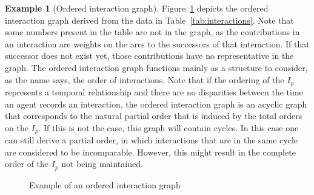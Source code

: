 \documentclass[a4paper,11pt]{book}
\theoremstyle{definition}
\newtheorem{example}{Example}
\begin{document}
\begin{example}[Ordered interaction graph]
    Figure~\ref{fig:ex_oig} depicts the ordered interaction graph derived from the data in Table~\ref{tab:interactions}.
    Note that some numbers present in the table are not in the graph, as the contributions in an interaction are
    weights on the arcs to the successors of that interaction. If that successor does not exist yet, those
    contributions have no representative in the graph. The ordered interaction graph functions mainly as a 
    structure to consider, as the name says, the order of interactions. Note that if the ordering of the $I_p$ represents
    a temporal relationship and there are no disparities between the time an agent records an interaction, 
    the ordered interaction graph is an acyclic graph that corresponds to the natural partial order that
    is induced by the total orders on the $I_p$. If this is not the case, this graph will contain cycles.
    In this case one can still derive a partial order, in which interactions that are in the same cycle
    are considered to be incomparable. However, this might result in the complete order of the $I_p$
    not being maintained.

    \begin{figure}[h]
        \centering
         \caption{Example of an ordered interaction graph}
         \label{fig:ex_oig}
    \end{figure}

\end{example}
\end{document}
